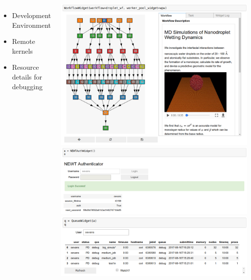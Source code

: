 \documentclass{tikzposter}
\begin{document}
\begin{columns}
 {
    \begin{itemize}
        \item Development Environment
        \item Remote kernels
        \item Resource details for debugging
    \end{itemize}
}





 {
    \includegraphics[width=\linewidth]{../img/screenshot/droplet_wf}
}
 {
    \includegraphics[width=\linewidth]{../img/screenshot/newt_auth}
}
 {
    \includegraphics[width=\linewidth]{../img/screenshot/queue}
}
\end{columns}
\end{document}
